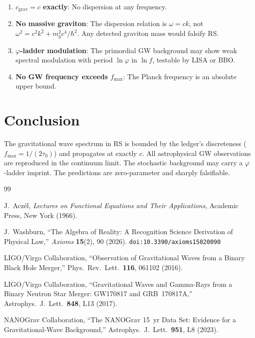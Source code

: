 \documentclass[12pt,a4paper]{article}
\theoremstyle{definition}
\theoremstyle{remark}
\begin{document}
\begin{enumerate}
  \item \textbf{$c_{\mathrm{grav}} = c$ exactly}: No dispersion
  at any frequency.

  \item \textbf{No massive graviton}: The dispersion relation is
  $\omega = ck$, not $\omega^2 = c^2k^2 + m_g^2c^4/\hbar^2$.
  Any detected graviton mass would falsify RS.

  \item \textbf{$\varphi$-ladder modulation}: The primordial GW
  background may show weak spectral modulation with period
  $\ln\varphi$ in $\ln f$, testable by LISA or BBO.

  \item \textbf{No GW frequency exceeds $f_{\max}$}: The Planck
  frequency is an absolute upper bound.
\end{enumerate}

\section{Conclusion}
\label{sec:conclusion}

The gravitational wave spectrum in RS is bounded by the ledger's
discreteness ($f_{\max} = 1/(2\tau_0)$) and propagates at exactly
$c$.  All astrophysical GW observations are reproduced in the
continuum limit.  The stochastic background may carry a $\varphi$-ladder
imprint.  The predictions are zero-parameter and sharply falsifiable.

\begin{thebibliography}{99}

J.~Acz\'el, \emph{Lectures on Functional Equations and Their Applications},
Academic Press, New York (1966).

J.~Washburn, ``The Algebra of Reality: A Recognition Science Derivation
of Physical Law,'' \emph{Axioms} \textbf{15}(2), 90 (2026).
\texttt{doi:10.3390/axioms15020090}

LIGO/Virgo Collaboration, ``Observation of Gravitational Waves from
a Binary Black Hole Merger,'' Phys.\ Rev.\ Lett.\ \textbf{116},
061102 (2016).

LIGO/Virgo Collaboration, ``Gravitational Waves and Gamma-Rays from
a Binary Neutron Star Merger: GW170817 and GRB~170817A,''
Astrophys.\ J.\ Lett.\ \textbf{848}, L13 (2017).

NANOGrav Collaboration, ``The NANOGrav 15~yr Data Set: Evidence for
a Gravitational-Wave Background,'' Astrophys.\ J.\ Lett.\
\textbf{951}, L8 (2023).

\end{thebibliography}
\end{document}

